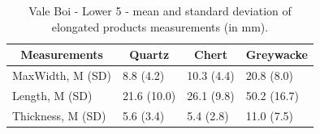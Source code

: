 \documentclass[12pt,twoside]{reedthesis}
\begin{document}
\newpage
\begin{table}[!h]

\caption{\label{tab:elongmetricsVB1}Vale Boi - Lower 5 - mean and standard deviation of elongated products measurements (in mm).}
\centering
\fontsize{9}{11}\selectfont
\begin{tabular}[t]{llll}
\toprule
\multicolumn{1}{c}{\textbf{Measurements}} & \multicolumn{1}{c}{\textbf{Quartz}} & \multicolumn{1}{c}{\textbf{Chert}} & \multicolumn{1}{c}{\textbf{Greywacke}}\\
\midrule
MaxWidth, M (SD) & 8.8 (4.2) & 10.3 (4.4) & 20.8 (8.0)\\
Length, M (SD) & 21.6 (10.0) & 26.1 (9.8) & 50.2 (16.7)\\
Thickness, M (SD) & 5.6 (3.4) & 5.4 (2.8) & 11.0 (7.5)\\
\bottomrule
\end{tabular}
\end{table}
\begin{table}[!h]

\caption{\label{tab:elongmtericsVB2}Vale Boi - Upper 5/4E - mean and standard deviation of elongated products measurements (in mm).}
\centering
{}
\end{table}
\newpage
\end{document}
